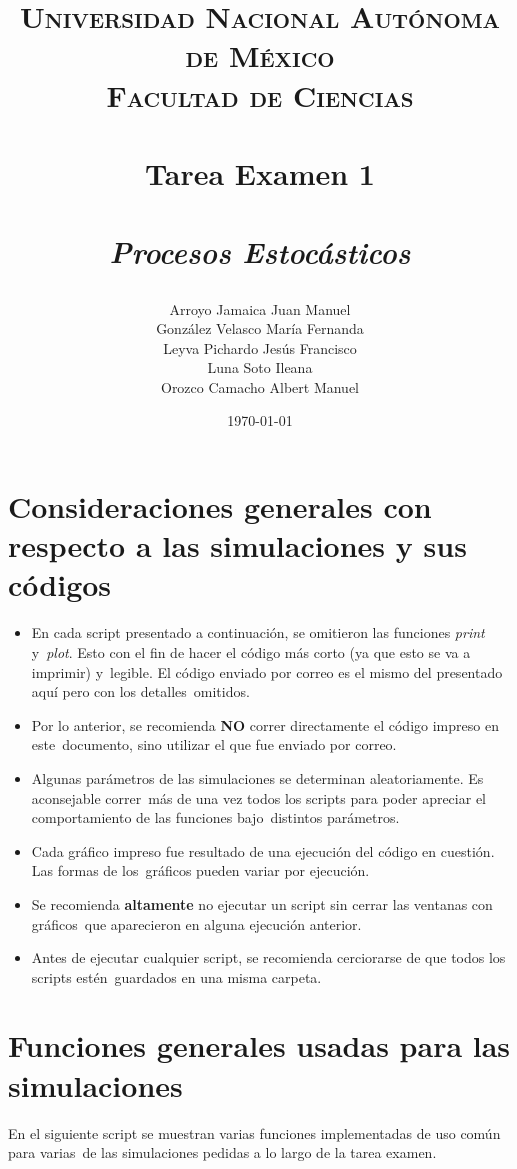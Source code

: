 \documentclass[paper=letter, fontsize=12pt]{scrartcl} %
\title{
  \vspace*{\fill}
  \begin{center}
    \normalfont \normalsize
    \textsc{Universidad Nacional Autónoma de México\\Facultad de Ciencias} \\ [25pt]
    \horrule{0.5pt} \\[0.4cm] %
    \huge \textbf{Tarea Examen 1} \\ %
    \horrule{2pt} \\[0.5cm] %
    \large \textit{Procesos Estocásticos} \\
  \end{center}
}
\author{Arroyo Jamaica Juan Manuel\\González Velasco María Fernanda\\
  Leyva Pichardo Jesús Francisco\\Luna Soto Ileana\\Orozco Camacho Albert Manuel}
\date{\normalsize\today} %
\numberwithin{equation}{section} %
\numberwithin{figure}{section} %
\numberwithin{table}{section} %
\begin{document}
\begin{titlepage}
  \maketitle
  \thispagestyle{empty}
  \vspace*{\fill}
\end{titlepage}

\section{Consideraciones generales con respecto a las simulaciones y sus códigos}

\begin{itemize}
\item En cada script presentado a continuación, se omitieron las funciones \textit{print} y\
  \textit{plot}. Esto con el fin de hacer el código más corto (ya que esto se va a imprimir) y\
  legible. El código enviado por correo es el mismo del presentado aquí pero con los detalles\
  omitidos.
\item Por lo anterior, se recomienda \textbf{NO} correr directamente el código impreso en este\
  documento, sino utilizar el que fue enviado por correo.
\item Algunas parámetros de las simulaciones se determinan aleatoriamente. Es aconsejable correr\
  más de una vez todos los scripts para poder apreciar el comportamiento de las funciones bajo\
  distintos parámetros.
\item Cada gráfico impreso fue resultado de una ejecución del código en cuestión. Las formas de los\
  gráficos pueden variar por ejecución.
\item Se recomienda \textbf{altamente} no ejecutar un script sin cerrar las ventanas con gráficos\
  que aparecieron en alguna ejecución anterior.
\item Antes de ejecutar cualquier script, se recomienda cerciorarse de que todos los scripts estén\
  guardados en una misma carpeta.
\end{itemize}

\section{Funciones generales usadas para las simulaciones}

En el siguiente script se muestran varias funciones implementadas de uso común para varias\
de las simulaciones pedidas a lo largo de la tarea examen.
\end{document}

